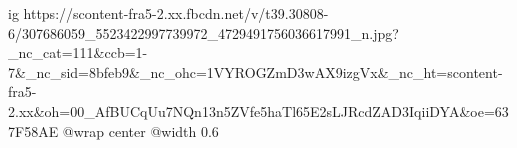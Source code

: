  
 
 
 
 

\ifcmt
  ig https://scontent-fra5-2.xx.fbcdn.net/v/t39.30808-6/307686059_5523422997739972_4729491756036617991_n.jpg?_nc_cat=111&ccb=1-7&_nc_sid=8bfeb9&_nc_ohc=1VYROGZmD3wAX9izgVx&_nc_ht=scontent-fra5-2.xx&oh=00_AfBUCqUu7NQn13n5ZVfe5haTl65E2sLJRcdZAD3IqiiDYA&oe=637F58AE
  @wrap center
  @width 0.6
\fi
